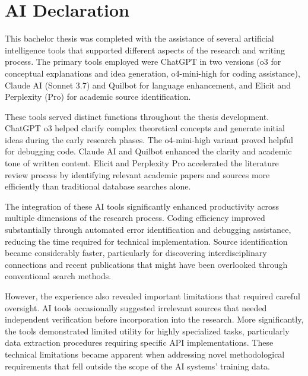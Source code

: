 \chapter*{AI Declaration}
\thispagestyle{empty}

This bachelor thesis was completed with the assistance of several artificial intelligence tools that supported different aspects of the research and writing process. The primary tools employed were ChatGPT in two versions (o3 for conceptual explanations and idea generation, o4-mini-high for coding assistance), Claude AI (Sonnet 3.7) and Quilbot for language enhancement, and Elicit and Perplexity (Pro) for academic source identification.

These tools served distinct functions throughout the thesis development. ChatGPT o3 helped clarify complex theoretical concepts and generate initial ideas during the early research phases. The o4-mini-high variant proved helpful for debugging code. Claude AI and Quilbot enhanced the clarity and academic tone of written content. Elicit and Perplexity Pro accelerated the literature review process by identifying relevant academic papers and sources more efficiently than traditional database searches alone.

The integration of these AI tools significantly enhanced productivity across multiple dimensions of the research process. Coding efficiency improved substantially through automated error identification and debugging assistance, reducing the time required for technical implementation. Source identification became considerably faster, particularly for discovering interdisciplinary connections and recent publications that might have been overlooked through conventional search methods.

However, the experience also revealed important limitations that required careful oversight. AI tools occasionally suggested irrelevant sources that needed independent verification before incorporation into the research. More significantly, the tools demonstrated limited utility for highly specialized tasks, particularly data extraction procedures requiring specific API implementations. These technical limitations became apparent when addressing novel methodological requirements that fell outside the scope of the AI systems' training data.